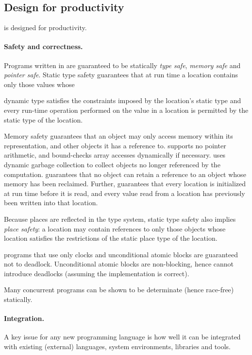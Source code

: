 \subsection{Design for productivity}
\Xten{} is designed for productivity.

\paragraph{Safety and correctness.}
Programs written in \Xten{} are guaranteed to be statically
\emph{type safe}, \emph{memory safe} and \emph{pointer safe}. Static type safety
guarantees that at run time a location contains only those values whose

dynamic type satisfies the constraints imposed by the location's
static type and every run-time operation performed on the value in a
location is permitted by the static type of the location.

Memory safety guarantees that an object may only access memory within
its representation, and other objects it has a reference to. \Xten{}
supports no pointer arithmetic, and bound-checks array accesses
dynamically if necessary. \Xten{} uses dynamic garbage collection to
collect objects no longer referenced by the computation. \Xten{}
guarantees that no object can retain a reference to an object
whose memory has been reclaimed.  Further, \Xten{} guarantees that
every location is initialized at run time before it is read,
and every value read from a location has previously been written into
that location.


Because places are reflected in the type system, static type safety
also implies \emph{place safety}: a location may contain references to only
those objects whose location satisfies the restrictions of the static
place type of the location.

\Xten{} programs that use only clocks and unconditional atomic
blocks are guaranteed not to deadlock. Unconditional atomic blocks
are non-blocking, hence cannot introduce deadlocks (assuming the
implementation is correct).

Many concurrent programs can be shown to be determinate (hence
race-free) statically.

\paragraph{Integration.}
A key issue for any new programming language is how well it can be
integrated with existing (external) languages, system environments,
libraries and tools.


